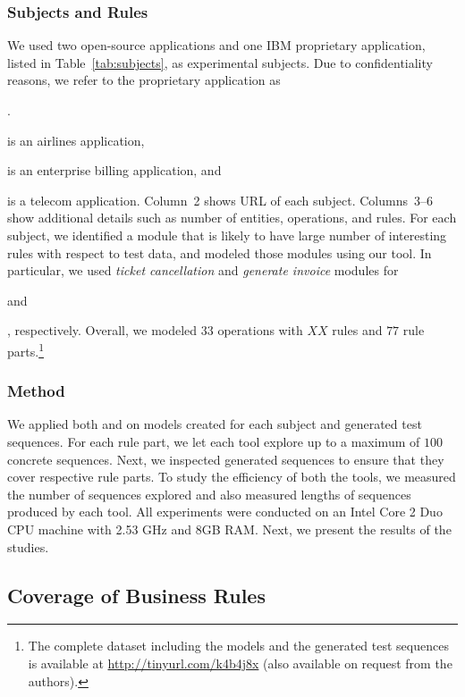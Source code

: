 \subsubsection{Subjects and Rules}

We used two open-source applications and one IBM proprietary application, listed
in Table~\ref{tab:subjects}, as experimental subjects. Due to confidentiality reasons,
we refer to the proprietary application as \subject{App}. \subject{Cebu-pacific} is
an airlines application, \subject{jBilling} is an enterprise billing application,
and \subject{App} is a telecom application. Column~2 shows URL of each subject.
Columns~3--6 show additional details such as number of entities, operations,
and rules. For each subject, we identified a module that is likely to have large
number of interesting rules with respect to test data, and modeled those modules using our tool. In particular,
we used \textit{ticket cancellation} and \textit{generate invoice} modules for \subject{Cebu-pacific} and 
\subject{jBilling}, respectively. Overall, we modeled $33$ operations with $XX$ rules and
$77$ rule parts.\footnote{The complete dataset including the models and the generated
test sequences is available at \url{http://tinyurl.com/k4b4j8x} (also available on request
from the authors).}

\subsubsection{Method}

We applied both \tool{} and \exhaust{} on models created for each subject and generated
test sequences. For each rule part, we let each tool explore up to a maximum of $100$
concrete sequences. Next, we inspected generated sequences to ensure that 
they cover respective rule parts. To study the efficiency of both the tools, we measured the number of sequences
explored and also measured lengths of sequences produced by each tool.
All experiments were conducted on an Intel Core 2 Duo CPU
machine with 2.53 GHz and 8GB RAM. Next, we present the results of the studies.

\subsection{Coverage of Business Rules}

